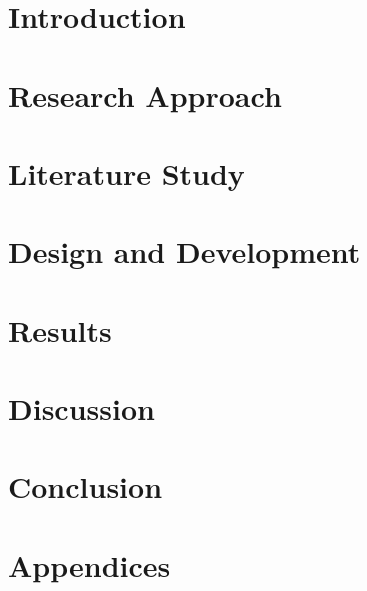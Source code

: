 \documentclass[12pt,a4paper]{book}
\newcommand{\blankpage}[0]{
	\newpage
	\thispagestyle{plain}
	\mbox{}
}
\begin{document}
\hypersetup{pageanchor=false}

\blankpage	
\cleardoublepage
\frontmatter



\tableofcontents
\listoftables
\listoffigures
\hypersetup{pageanchor=true}

\mainmatter
\part{Introduction}\label{part:introduction}


\part{Research Approach}\label{part:approach}


\part{Literature Study}\label{part:literature}


\part{Design and Development}\label{part:development}


\part{Results}\label{part:results}


\part{Discussion}\label{part:discussion}


\part{Conclusion}\label{part:conslusion}


\clearpage
\backmatter

\part{Appendices}
\end{document}
